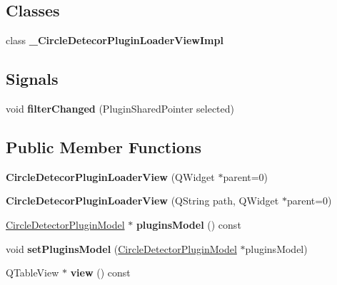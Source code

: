 \subsection*{Classes}
\begin{DoxyCompactItemize}
\item 
class {\bfseries \+\_\+\+Circle\+Detecor\+Plugin\+Loader\+View\+Impl}
\end{DoxyCompactItemize}
\subsection*{Signals}
\begin{DoxyCompactItemize}
\item 
\mbox{\label{class_circle_detecor_plugin_loader_view_a0ea0f41f2396e013223b6fdfdbe3ab81}} 
void {\bfseries filter\+Changed} (Plugin\+Shared\+Pointer selected)
\end{DoxyCompactItemize}
\subsection*{Public Member Functions}
\begin{DoxyCompactItemize}
\item 
\mbox{\label{class_circle_detecor_plugin_loader_view_a630b30d66954077fd0b198ffb4a66f6f}} 
{\bfseries Circle\+Detecor\+Plugin\+Loader\+View} (Q\+Widget $\ast$parent=0)
\item 
\mbox{\label{class_circle_detecor_plugin_loader_view_a49fc1a82f51660d97c07ab6c4a2e40dc}} 
{\bfseries Circle\+Detecor\+Plugin\+Loader\+View} (Q\+String path, Q\+Widget $\ast$parent=0)
\item 
\mbox{\label{class_circle_detecor_plugin_loader_view_a44f84afba2f2d22c4b5b609e31ddf856}} 
\hyperlink{class_circle_detector_plugin_model}{Circle\+Detector\+Plugin\+Model} $\ast$ {\bfseries plugins\+Model} () const
\item 
\mbox{\label{class_circle_detecor_plugin_loader_view_aae31cfc2a3e23c0b59e1f38b5fb256b8}} 
void {\bfseries set\+Plugins\+Model} (\hyperlink{class_circle_detector_plugin_model}{Circle\+Detector\+Plugin\+Model} $\ast$plugins\+Model)
\item 
\mbox{\label{class_circle_detecor_plugin_loader_view_ad5542378dc3e64ea1af65dc119ad403f}} 
Q\+Table\+View $\ast$ {\bfseries view} () const
\end{DoxyCompactItemize}


